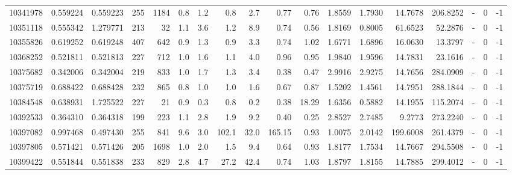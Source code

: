 \begin{tabular}{rrrrrrrrrrrrrrrlrr}
  10341978 & 0.559224 &   0.559223 &  255 & 1184 &      0.8 &      1.2 &     0.8 &      2.7 &       0.77 &        0.76 &  1.8559 &  1.7930 &   14.7678 &  206.8252 &             - &        0 &         -1 \\
  10351118 & 0.555342 &   1.279771 &  213 &   32 &      1.1 &      3.6 &     1.2 &      8.9 &       0.74 &        0.56 &  1.8169 &  0.8005 &   61.6523 &   52.2876 &             - &        0 &         -1 \\
  10355826 & 0.619252 &   0.619248 &  407 &  642 &      0.9 &      1.3 &     0.9 &      3.3 &       0.74 &        1.02 &  1.6771 &  1.6896 &   16.0630 &   13.3797 &             - &        0 &         -1 \\
  10368252 & 0.521811 &   0.521813 &  227 &  712 &      1.0 &      1.6 &     1.1 &      4.0 &       0.96 &        0.95 &  1.9840 &  1.9596 &   14.7831 &   23.1616 &             - &        0 &         -1 \\
  10375682 & 0.342006 &   0.342004 &  219 &  833 &      1.0 &      1.7 &     1.3 &      3.4 &       0.38 &        0.47 &  2.9916 &  2.9275 &   14.7656 &  284.0909 &             - &        0 &         -1 \\
  10375719 & 0.688422 &   0.688428 &  232 &  865 &      0.8 &      1.0 &     1.0 &      1.6 &       0.67 &        0.87 &  1.5202 &  1.4561 &   14.7951 &  288.1844 &             - &        0 &         -1 \\
  10384548 & 0.638931 &   1.725522 &  227 &   21 &      0.9 &      0.3 &     0.8 &      0.2 &       0.38 &       18.29 &  1.6356 &  0.5882 &   14.1955 &  115.2074 &             - &        0 &         -1 \\
  10392533 & 0.364310 &   0.364318 &  199 &  223 &      1.1 &      2.8 &     1.9 &      9.2 &       0.40 &        0.25 &  2.8527 &  2.7485 &    9.2773 &  273.2240 &             - &        0 &         -1 \\
  10397082 & 0.997468 &   0.497430 &  255 &  841 &      9.6 &      3.0 &   102.1 &     32.0 &     165.15 &        0.93 &  1.0075 &  2.0142 &  199.6008 &  261.4379 &             - &        0 &         -1 \\
  10397805 & 0.571421 &   0.571426 &  205 & 1698 &      1.0 &      2.0 &     1.5 &      9.4 &       0.64 &        0.93 &  1.8177 &  1.7534 &   14.7667 &  294.5508 &             - &        0 &         -1 \\
  10399422 & 0.551844 &   0.551838 &  233 &  829 &      2.8 &      4.7 &    27.2 &     42.4 &       0.74 &        1.03 &  1.8797 &  1.8155 &   14.7885 &  299.4012 &             - &        0 &         -1 \\

\end{tabular}
